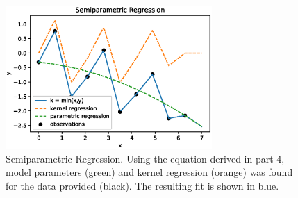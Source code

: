 \documentclass{article}[12pt]
\begin{document}
\begin{enumerate}
\begin{figure}[H]
\centering
\includegraphics[width=0.7\textwidth]{./img/semipara.eps}
\caption{Semiparametric Regression. Using the equation derived in part 4, model parameters (green) and kernel regression (orange) was found for the data provided (black). The resulting fit is shown in blue.}
\end{figure}

\end{enumerate}
\end{document}
